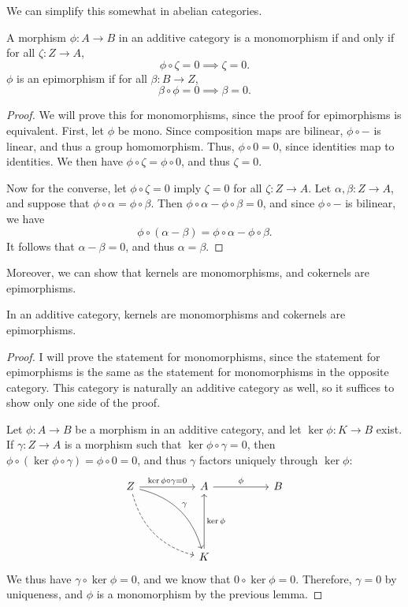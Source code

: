 We can simplify this somewhat in abelian categories.
\begin{lemma}\label{lma:9.1}
	A morphism $\phi : A \to B$ in an additive category is a monomorphism if and only if for all $\zeta : Z \to A$,
	\[
		\phi \circ \zeta =0\implies \zeta =0
	.\]
	$\phi $ is an epimorphism if for all $\beta : B \to Z$,
	\[
		\beta \circ \phi =0\implies \beta =0
	.\]
	
\end{lemma}
\begin{proof}
	We will prove this for monomorphisms, since the proof for epimorphisms is equivalent. First, let $\phi $ be mono. Since composition maps are bilinear, $\phi \circ -$ is linear, and thus a group homomorphism. Thus, $\phi \circ 0=0$, since identities map to identities. We then have $\phi \circ \zeta =\phi \circ 0$, and thus $\zeta =0$.

	Now for the converse, let $\phi \circ \zeta =0$ imply $\zeta =0$ for all $\zeta : Z \to A$. Let $\alpha ,\beta : Z \to A$, and suppose that $\phi \circ \alpha =\phi \circ \beta $. Then $\phi \circ \alpha -\phi \circ \beta =0$, and since $\phi \circ -$ is bilinear, we have
	\[
		\phi \circ (\alpha -\beta )=\phi \circ \alpha -\phi \circ \beta 
	.\]
	It follows that $\alpha -\beta =0$, and thus $\alpha =\beta $.
\end{proof}

Moreover, we can show that kernels are monomorphisms, and cokernels are epimorphisms.

\begin{lemma}\label{lma:9.2}
	In an additive category, kernels are monomorphisms and cokernels are epimorphisms.
\end{lemma}
\begin{proof}
	I will prove the statement for monomorphisms, since the statement for epimorphisms is the same as the statement for monomorphisms in the opposite category. This category is naturally an additive category as well, so it suffices to show only one side of the proof.

	Let $\phi : A \to B$ be a morphism in an additive category, and let $\ker \phi : K \to B$ exist. If $\gamma : Z \to A$ is a morphism such that $\ker \phi \circ \gamma =0$, then $\phi \circ (\ker \phi \circ \gamma )=\phi \circ 0=0$, and thus $\gamma $ factors uniquely through $\ker \phi $:
	\[\begin{tikzcd}[row sep = 5em, column sep = 5em]
		Z\arrow[dr, bend left, "\gamma "]\arrow[dr, bend right, dashed]\arrow[r, "\ker \phi \circ \gamma =0"]&A\arrow[r, "\phi "]&B\\
									       &K\arrow[u, "\ker \phi "']
	\end{tikzcd}\]
We thus have $\gamma \circ \ker \phi =0$, and we know that $0\circ \ker \phi =0$. Therefore, $\gamma =0$ by uniqueness, and $\phi $ is a monomorphism by the previous lemma.
\end{proof}

